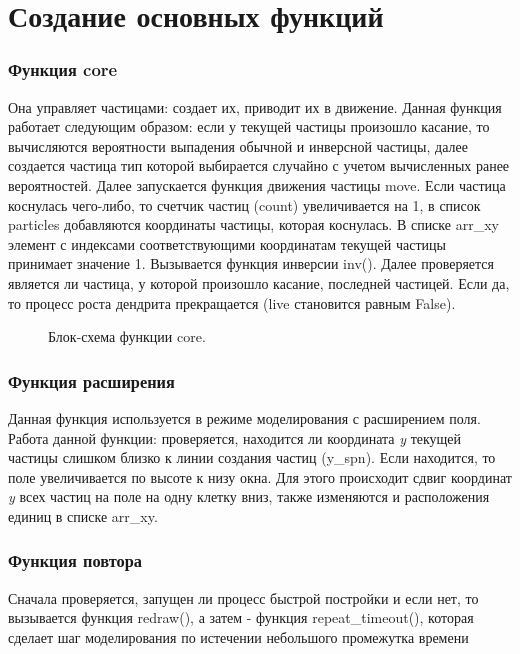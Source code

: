 \section{Создание основных функций}
\subsubsection{Функция core}
Она управляет частицами: создает их, приводит их в движение. Данная функция работает следующим образом: если у текущей частицы произошло касание, то вычисляются вероятности выпадения обычной и инверсной частицы, далее создается частица тип которой выбирается случайно с учетом вычисленных ранее вероятностей. Далее запускается функция движения частицы move. Если частица коснулась чего-либо, то счетчик частиц (count) увеличивается на 1, в список particles добавляются координаты частицы, которая коснулась. В списке arr\_xy элемент с индексами соответствующими координатам текущей частицы принимает значение 1. Вызывается функция инверсии inv(). Далее проверяется является ли частица, у которой произошло касание, последней частицей. Если да, то процесс роста дендрита прекращается (live становится равным False).

\begin{figure}[H]
    \centering
    
    \caption{Блок-схема функции core.}
\end{figure}

\subsubsection{Функция расширения}
Данная функция используется в режиме моделирования с расширением поля. Работа данной функции: проверяется, находится ли координата \textit{y} текущей частицы слишком близко к линии создания частиц (y\_spn). Если находится, то поле увеличивается по высоте к низу окна.
Для этого происходит сдвиг координат \textit{y} всех частиц на поле на одну клетку вниз, также изменяются и расположения единиц в списке arr\_xy.
\subsubsection{Функция повтора}
Сначала проверяется, запущен ли процесс быстрой постройки и если нет, то вызывается функция redraw(), а затем - функция repeat\_timeout(), которая сделает шаг моделирования по истечении небольшого промежутка времени~\cite{expleGit}


